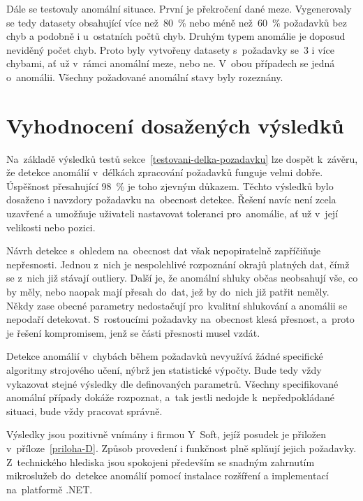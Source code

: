 Dále se testovaly anomální situace. První je překročení dané meze. Vygenerovaly se tedy datasety obsahující více než~80~\% nebo méně než~60~\% požadavků bez chyb a podobně i u~ostatních počtů chyb. Druhým typem anomálie je doposud neviděný počet chyb. Proto byly vytvořeny datasety s~požadavky se~3 i více chybami, ať už v~rámci anomální meze, nebo ne. V~obou případech se jedná o~anomálii. Všechny požadované anomální stavy byly rozeznány.

\section{Vyhodnocení dosažených výsledků}
Na~základě výsledků testů sekce~\ref{testovani-delka-pozadavku} lze dospět k~závěru, že detekce anomálií v~délkách zpracování požadavků funguje velmi dobře. Úspěšnost přesahující 98~\% je toho zjevným důkazem. Těchto výsledků bylo dosaženo i navzdory požadavku na~obecnost detekce. Řešení navíc není zcela uzavřené a umožňuje uživateli nastavovat toleranci pro~anomálie, ať už v~její velikosti nebo pozici.

Návrh detekce s~ohledem na~obecnost dat však nepopiratelně zapříčiňuje nepřesnosti. Jednou z~nich je nespolehlivé rozpoznání okrajů platných dat, čímž se z~nich již stávají outliery. Další je, že anomální shluky občas neobsahují vše, co by měly, nebo naopak mají přesah do~dat, jež by do~nich již patřit neměly. Někdy zase obecné parametry nedostačují pro~kvalitní shlukování a anomálii se nepodaří detekovat. S~rostoucími požadavky na~obecnost klesá přesnost, a~proto je řešení kompromisem, jenž se části přesnosti musel vzdát.

Detekce anomálií v~chybách během požadavků nevyužívá žádné specifické algoritmy strojového učení, nýbrž jen statistické výpočty. Bude tedy vždy vykazovat stejné výsledky dle definovaných parametrů. Všechny specifikované anomální případy dokáže rozpoznat, a~tak jestli nedojde k~nepředpokládané situaci, bude vždy pracovat správně.

Výsledky jsou pozitivně vnímány i firmou Y~Soft, jejíž posudek je přiložen v~příloze~\ref{priloha-D}. Způsob provedení i funkčnost plně splňují jejich požadavky. Z~technického hlediska jsou spokojeni především se snadným zahrnutím mikroslužeb do~detekce anomálií pomocí instalace rozšíření a implementací na~platformě .NET.